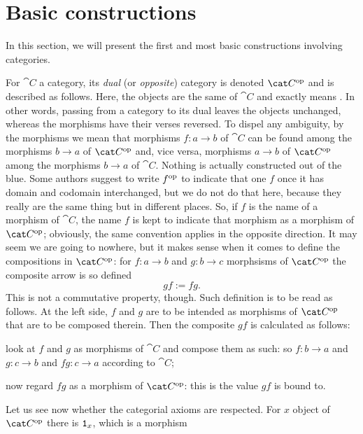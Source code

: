 
\section{Basic constructions}

In this section, we will present the first and most basic
constructions involving categories.

For \(\cat C\) a category, its {\em dual} (or {\em opposite}) category
is denoted \(\op{\cat C}\) and is described as follows. Here, the
objects are the same of \(\cat C\) and  exactly means . In other words, passing from a category to its dual
leaves the objects unchanged, whereas the morphisms have their verses
reversed. To dispel any ambiguity, by  the morphisms we
mean that morphisms \(f : a \to b\) of \(\cat C\) can be found among the
morphisms \(b \to a\) of \(\op{\cat C}\) and, vice versa, morphisms
\(a \to b\) of \(\op{\cat C}\) among the morphisms \(b \to a\) of
\(\cat C\). Nothing is actually constructed out of the blue. Some
authors suggest to write \(f^\text{op}\) to indicate that one \(f\) once it
has domain and codomain interchanged, but we do not do that here,
because they really are the same thing but in different places. So, if
\(f\) is the name of a morphism of \(\cat C\), the name \(f\) is kept
to indicate that morphism as a morphism of \(\op{\cat C}\); obviously,
the same convention applies in the opposite direction. It may seem we
are going to nowhere, but it makes sense when it comes to define the
compositions in \(\op{\cat C}\): for \(f : a \to b\) and
\(g : b \to c\) morphsisms of \(\op{\cat C}\) the composite arrow is so
defined
\[gf := fg .\label{defeqn:DualComp}\] This is not a commutative
property, though. Such definition is to be read as follows. At the
left side, \(f\) and \(g\) are to be intended as morphisms of
\(\op{\cat C}\) that are to be composed therein. Then the composite
\(gf\) is calculated as follows:
\begin{tcbenum}
\item look at \(f\) and \(g\) as morphisms of \(\cat C\) and compose
  them as such: so \(f : b \to a\) and \(g : c \to b\) and
  \(fg : c \to a\) according to \(\cat C\);
\item now regard \(fg\) as a morphism of \(\op{\cat C}\): this is the
  value \(gf\) is bound to.
\end{tcbenum}
Let us see now whether the categorial axioms are respected. For \(x\)
object of \(\op {\cat C}\) there is \(\mathtt 1_x\), which is a morphism
